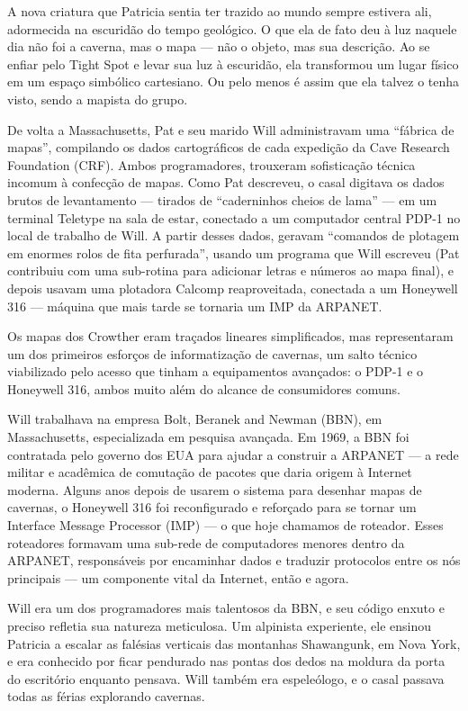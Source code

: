 \documentclass[12pt,a4paper]{article}
\begin{document}
A nova criatura que Patricia sentia ter trazido ao mundo sempre estivera ali, adormecida na escuridão do tempo geológico.
O que ela de fato deu à luz naquele dia não foi a caverna, mas o mapa — não o objeto, mas sua descrição.
Ao se enfiar pelo Tight Spot e levar sua luz à escuridão, ela transformou um lugar físico em um espaço simbólico cartesiano.
Ou pelo menos é assim que ela talvez o tenha visto, sendo a mapista do grupo.

De volta a Massachusetts, Pat e seu marido Will administravam uma “fábrica de mapas”, compilando os dados cartográficos de cada expedição da Cave Research Foundation (CRF).
Ambos programadores, trouxeram sofisticação técnica incomum à confecção de mapas.
Como Pat descreveu, o casal digitava os dados brutos de levantamento — tirados de “caderninhos cheios de lama” — em um terminal Teletype na sala de estar, conectado a um computador central PDP-1 no local de trabalho de Will.
A partir desses dados, geravam “comandos de plotagem em enormes rolos de fita perfurada”, usando um programa que Will escreveu (Pat contribuiu com uma sub-rotina para adicionar letras e números ao mapa final), e depois usavam uma plotadora Calcomp reaproveitada, conectada a um Honeywell 316 — máquina que mais tarde se tornaria um IMP da ARPANET.

Os mapas dos Crowther eram traçados lineares simplificados, mas representaram um dos primeiros esforços de informatização de cavernas, um salto técnico viabilizado pelo acesso que tinham a equipamentos avançados: o PDP-1 e o Honeywell 316, ambos muito além do alcance de consumidores comuns.

Will trabalhava na empresa Bolt, Beranek and Newman (BBN), em Massachusetts, especializada em pesquisa avançada.
Em 1969, a BBN foi contratada pelo governo dos EUA para ajudar a construir a ARPANET — a rede militar e acadêmica de comutação de pacotes que daria origem à Internet moderna.
Alguns anos depois de usarem o sistema para desenhar mapas de cavernas, o Honeywell 316 foi reconfigurado e reforçado para se tornar um Interface Message Processor (IMP) — o que hoje chamamos de roteador.
Esses roteadores formavam uma sub-rede de computadores menores dentro da ARPANET, responsáveis por encaminhar dados e traduzir protocolos entre os nós principais — um componente vital da Internet, então e agora.

Will era um dos programadores mais talentosos da BBN, e seu código enxuto e preciso refletia sua natureza meticulosa.
Um alpinista experiente, ele ensinou Patricia a escalar as falésias verticais das montanhas Shawangunk, em Nova York, e era conhecido por ficar pendurado nas pontas dos dedos na moldura da porta do escritório enquanto pensava.
Will também era espeleólogo, e o casal passava todas as férias explorando cavernas.
\end{document}
